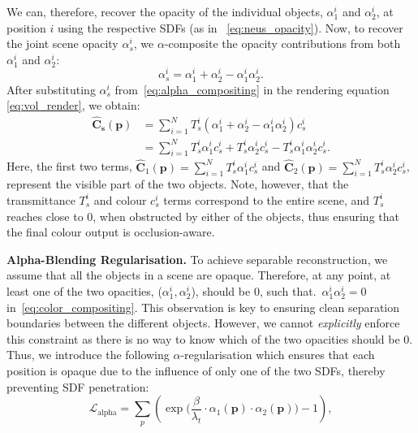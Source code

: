 We can, therefore, recover the opacity of the individual objects, $\alpha_1^i$ and $\alpha_2^i$, at position $i$ using the respective SDFs (as in ~\cref{eq:neus_opacity}). 
Now, to recover the joint scene opacity $\alpha_s^i$, we $\alpha$-composite the opacity contributions from both $\alpha_1^i$ and $\alpha_2^i$: 
\begin{equation} \label{eq:alpha_compositing}
    \alpha^{i}_{s} = \alpha^{i}_{1} + \alpha^{i}_{2} - \alpha^{i}_{1} \alpha^{i}_{2}. 
\end{equation}
After substituting $\alpha^{i}_{s}$ from~\cref{eq:alpha_compositing} in the rendering equation \eqref{eq:vol_render}, we obtain: 
\begin{align}
\mathbf{\hat{C}_{s}}(\mathbf{p}) &= \sum_{i=1}^{N} T^{i}_{s} \left( \alpha^{i}_{1} + \alpha^{i}_{2} - \alpha^{i}_{1} \alpha^{i}_{2} \right) c^{i}_{s}  \nonumber \\
&= \sum_{i=1}^{N} T^{i}_{s} \alpha^{i}_{1} c^{i}_{s} + T^{i}_{s} \alpha^{i}_{2} c^{i}_{s} -  T^{i}_{s} \alpha^{i}_{1} \alpha^{i}_{2} c^{i}_{s}. 
\label{eq:color_compositing}
\end{align}
Here, the first two terms,  $\mathbf{\hat{C}}_1(\mathbf{p}) = \sum_{i=1}^{N} T^{i}_{s} \alpha^{i}_{1} c^{i}_{s}$ and $\mathbf{\hat{C}}_2(\mathbf{p}) = \sum_{i=1}^{N} T^{i}_{s} \alpha^{i}_{2} c^{i}_{s}$, represent the visible part of the two objects. 
Note, however, that the transmittance $T_s^i$ and colour $c_s^i$ terms correspond to the entire scene, and $T_s^i$ reaches close to 0, when obstructed by either of the objects, thus ensuring that the final colour output is occlusion-aware.
\par 
\textbf{Alpha-Blending Regularisation.}
To achieve separable reconstruction, we assume that all the objects in a scene are opaque.
Therefore, at any point, at least one of the two opacities, ($\alpha_1^i, \alpha_2^i$), should be $0$, such that.~$\alpha_1^i \alpha_2^i = 0$ in~\cref{eq:color_compositing}. 
This observation is key to ensuring clean separation boundaries between the different objects.
However, we cannot \textit{explicitly} enforce this constraint as there is no way to know which of the two opacities should be $0$.
Thus, we introduce the following $\alpha$-regularisation which ensures that each position is opaque due to the influence of only one of the two SDFs, thereby preventing SDF penetration: 
\begin{equation}
\label{eq:alpha_reg}
    \mathcal{L}_{\text{alpha}} = \sum_p \left(\exp\bigg(\frac{\beta}{\lambda_t} \cdot \alpha_1(\mathbf{p}) \cdot \alpha_2(\mathbf{p})\bigg) - 1\right), 
\end{equation}
